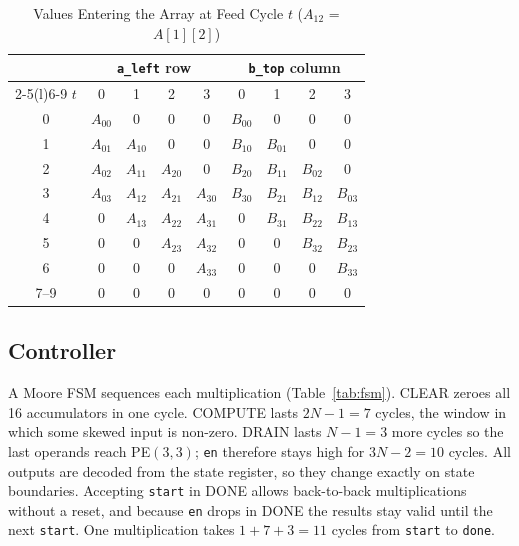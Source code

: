 \documentclass[conference]{IEEEtran}
\newcommand{\code}[1]{\texttt{#1}}
\begin{document}
\begin{table}[t]
  \centering
  \caption{Values Entering the Array at Feed Cycle $t$ ($A_{12}$ = $A[1][2]$)}
  \label{tab:skew}
  \footnotesize
  \setlength{\tabcolsep}{3pt}
  \begin{tabular}{@{}c cccc cccc@{}}
    \toprule
    & \multicolumn{4}{c}{\code{a\_left} row} & \multicolumn{4}{c}{\code{b\_top} column}\\
    \cmidrule(lr){2-5}\cmidrule(l){6-9}
    $t$ & 0 & 1 & 2 & 3 & 0 & 1 & 2 & 3 \\
    \midrule
    0 & $A_{00}$ & 0 & 0 & 0 & $B_{00}$ & 0 & 0 & 0 \\
    1 & $A_{01}$ & $A_{10}$ & 0 & 0 & $B_{10}$ & $B_{01}$ & 0 & 0 \\
    2 & $A_{02}$ & $A_{11}$ & $A_{20}$ & 0 & $B_{20}$ & $B_{11}$ & $B_{02}$ & 0 \\
    3 & $A_{03}$ & $A_{12}$ & $A_{21}$ & $A_{30}$ & $B_{30}$ & $B_{21}$ & $B_{12}$ & $B_{03}$ \\
    4 & 0 & $A_{13}$ & $A_{22}$ & $A_{31}$ & 0 & $B_{31}$ & $B_{22}$ & $B_{13}$ \\
    5 & 0 & 0 & $A_{23}$ & $A_{32}$ & 0 & 0 & $B_{32}$ & $B_{23}$ \\
    6 & 0 & 0 & 0 & $A_{33}$ & 0 & 0 & 0 & $B_{33}$ \\
    7--9 & 0 & 0 & 0 & 0 & 0 & 0 & 0 & 0 \\
    \bottomrule
  \end{tabular}
\end{table}

\subsection{Controller}
A Moore FSM sequences each multiplication (Table~\ref{tab:fsm}). CLEAR zeroes
all 16 accumulators in one cycle. COMPUTE lasts $2N-1 = 7$ cycles, the window
in which some skewed input is non-zero. DRAIN lasts $N-1 = 3$ more cycles so
the last operands reach PE$(3,3)$; \code{en} therefore stays high for $3N-2 =
10$ cycles. All outputs are decoded from the state register, so they change
exactly on state boundaries. Accepting \code{start} in DONE allows
back-to-back multiplications without a reset, and because \code{en} drops in
DONE the results stay valid until the next \code{start}. One multiplication
takes $1+7+3 = 11$ cycles from \code{start} to \code{done}.
\end{document}
